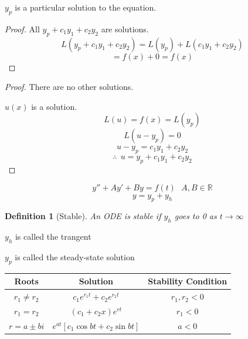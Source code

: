 \documentclass[12pt]{article}
\newtheorem{definition}{Definition}[section]
\numberwithin{equation}{subsection}
\newcommand{\inda}{\hspace{.5cm}}
\begin{document}
\inda $y_p$ is a particular solution to the equation.

\begin{proof} All $y_p+c_1y_1+c_2y_2$ are solutions.
\begin{equation}
L(y_p+c_1y_1+c_2y_2)= L(y_p)+L(c_1y_1+c_2y_2)
\end{equation}
\begin{equation}
= f(x)+0= f(x)
\end{equation}

\end{proof}

\begin{proof} There are no other solutions.

$u(x)$ is a solution.
\begin{equation}
L(u)=f(x)=L(y_p)
\end{equation}
\begin{equation}
L(u-y_p)=0
\end{equation}
\begin{equation}
u-y_p=c_1y_1+c_2y_2
\end{equation}
\begin{equation}
\therefore \ \ u=y_p+c_1y_1+c_2y_2
\end{equation}
\end{proof}

\begin{equation}
y''+Ay'+By=f(t)\ \ \  A,B \in \mathbb{R}
\end{equation}
\begin{equation}
y=y_p+y_h
\end{equation}
\begin{definition}[Stable]
An ODE is stable if $y_h$ goes to 0 as $t \rightarrow \infty $
\end{definition}

$y_h$ is called the trangent

$y_p$ is called the steady-state solution\\

\begin{center}
\begin{tabular}{|c|c|c|}
\hline 
Roots & Solution & Stability Condition \\ 
\hline 
$r_1 \neq r_2$ & $c_1e^{r_1t} + c_2e^{r_2t}$ & $r_1, r_2 < 0$ \\ 
\hline 
$r_1 = r_2$ & $(c_1+c_2x)e^{rt}$ & $r_1< 0$\\ 
\hline 
$r = a \pm bi$ & $e^{at}[c_1\cos bt + c_2 \sin bt]$ & $a < 0$ \\ 
\hline 
\end{tabular} 
\end{center}
\end{document}
